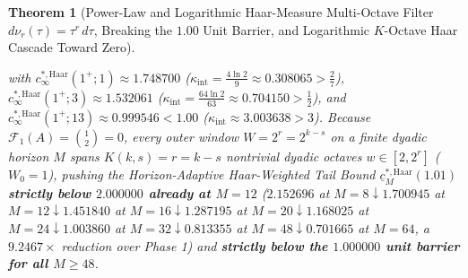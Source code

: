 \documentclass[11pt,reqno]{amsart}
\newtheorem{theorem}{Theorem}[section]
\theoremstyle{definition}
\theoremstyle{remark}
\begin{document}
\begin{theorem}[Power-Law and Logarithmic Haar-Measure Multi-Octave Filter $d\nu_r(\tau) = \tau^r\,d\tau$, Breaking the $1.00$ Unit Barrier, and Logarithmic $K$-Octave Haar Cascade Toward Zero]
\begin{enumerate}
  with $c_\infty^{*,\mathrm{Haar}}(1^+; 1) \approx 1.748700$ ($\kappa_{\mathrm{int}} = \frac{4\ln 2}{9} \approx 0.308065 > \frac{2}{7}$), $c_\infty^{*,\mathrm{Haar}}(1^+; 3) \approx 1.532061$ ($\kappa_{\mathrm{int}} = \frac{64\ln 2}{63} \approx 0.704150 > \frac{1}{2}$), and $c_\infty^{*,\mathrm{Haar}}(1^+; 13) \approx \mathbf{0.999546} < 1.00$ ($\kappa_{\mathrm{int}} \approx 3.003638 > 3$). Because $\mathcal{F}_1(A) = \binom{1}{2} = 0$, every outer window $W = 2^r = 2^{k-s}$ on a finite dyadic horizon $M$ spans $K(k, s) = r = k - s$ nontrivial dyadic octaves $w \in [2, 2^r]$ ($W_0 = 1$), pushing the Horizon-Adaptive Haar-Weighted Tail Bound $\underline{c}_M^{*,\mathrm{Haar}}(1.01)$ \textbf{strictly below $2.000000$ already at $M = 12$} ($2.152696$ at $M=8 \downarrow \mathbf{1.700945}$ at $M=12 \downarrow 1.451840$ at $M=16 \downarrow 1.287195$ at $M=20 \downarrow 1.168025$ at $M=24 \downarrow 1.003860$ at $M=32 \downarrow \mathbf{0.813355}$ at $M=48 \downarrow \mathbf{0.701665}$ at $M=64$, a $9.2467\times$ reduction over Phase 1) and \textbf{strictly below the $1.000000$ unit barrier for all $M \ge 48$}.
\end{enumerate}
\end{theorem}
\end{document}
